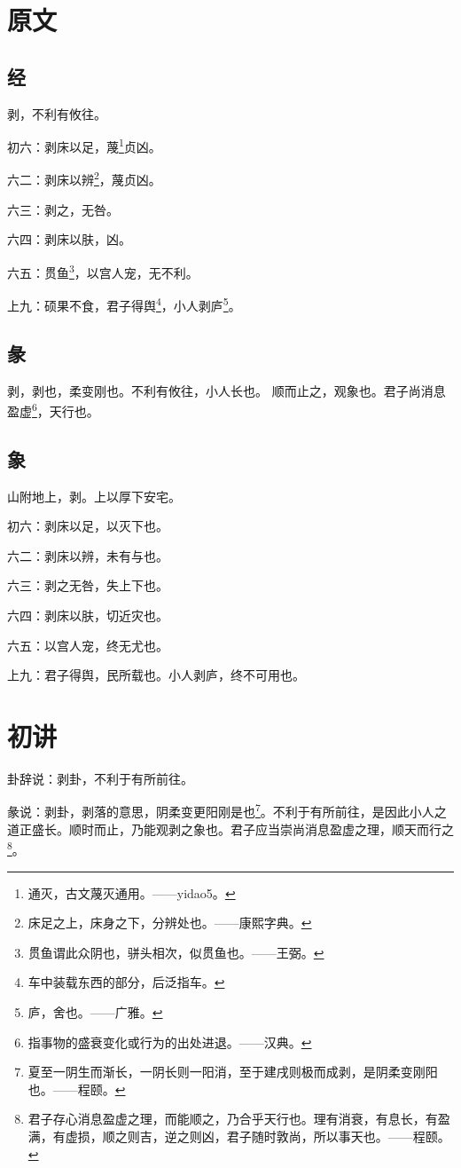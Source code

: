 \documentclass[12pt,oneside]{book}
\begin{document}
\section{原文}
\subsection{经}
剥，不利有攸往。

初六：剥床以足，蔑\footnote{通灭，古文蔑灭通用。——yidao5。}贞凶。

六二：剥床以辨\footnote{床足之上，床身之下，分辨处也。——康熙字典。}，蔑贞凶。

六三：剥之，无咎。

六四：剥床以肤，凶。

六五：贯鱼\footnote{贯鱼谓此众阴也，骈头相次，似贯鱼也。——王弼。}，以宫人宠，无不利。

上九：硕果不食，君子得舆\footnote{车中装载东西的部分，后泛指车。}，小人剥庐\footnote{庐，舍也。——广雅。}。

\subsection{彖}
剥，剥也，柔变刚也。不利有攸往，小人长也。 顺而止之，观象也。君子尚消息盈虚\footnote{指事物的盛衰变化或行为的出处进退。——汉典。}，天行也。

\subsection{象}
山附地上，剥。上以厚下安宅。

初六：剥床以足，以灭下也。

六二：剥床以辨，未有与也。

六三：剥之无咎，失上下也。

六四：剥床以肤，切近灾也。

六五：以宫人宠，终无尤也。

上九：君子得舆，民所载也。小人剥庐，终不可用也。

\section{初讲}
卦辞说：剥卦，不利于有所前往。

彖说：剥卦，剥落的意思，阴柔变更阳刚是也\footnote{夏至一阴生而渐长，一阴长则一阳消，至于建戌则极而成剥，是阴柔变刚阳也。——程颐。}。不利于有所前往，是因此小人之道正盛长。顺时而止，乃能观剥之象也。君子应当崇尚消息盈虚之理，顺天而行之\footnote{君子存心消息盈虚之理，而能顺之，乃合乎天行也。理有消衰，有息长，有盈满，有虚损，顺之则吉，逆之则凶，君子随时敦尚，所以事天也。——程颐。}。
\end{document}
